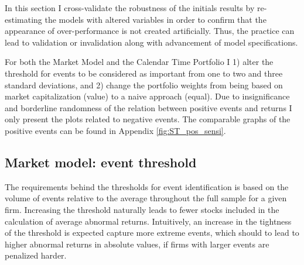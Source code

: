 

In this section I cross-validate the robustness of the initials results by re-estimating the models with altered variables in order to confirm that the appearance of over-performance is not created artificially. Thus, the practice can lead to validation or invalidation along with advancement of model specifications. 

For both the Market Model and the Calendar Time Portfolio I 1) alter the threshold for events to be considered as important from one to two and three standard deviations, and 2) change the portfolio weights from being based on market capitalization (value) to a naive approach (equal). Due to insignificance and borderline randomness of the relation between positive events and returns I only present the plots related to negative events. The comparable graphs of the positive events can be found in Appendix \ref{fig:ST_pos_sensi}.

\subsection{Market model: event threshold} \label{sec: sens_st_sd}

The requirements behind the thresholds for event identification is based on the volume of events relative to the average throughout the full sample for a given firm. Increasing the threshold naturally leads to fewer stocks included in the calculation of average abnormal returns. Intuitively, an increase in the tightness of the threshold is expected capture more extreme events, which should to lead to higher abnormal returns in absolute values, if firms with larger events are penalized harder.  

